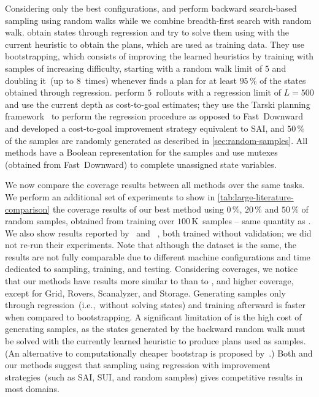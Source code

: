 Considering only the best configurations, \citet{ferber2022neural} and \citet{otoole2022sampling} perform backward search-based sampling using random walks while we combine breadth-first search with random walk. \citet{ferber2022neural} obtain states through regression and try to solve them using \gbfs with the current heuristic to obtain the plans, which are used as training data. They use bootstrapping, which consists of improving the learned heuristics by training with samples of increasing difficulty, starting with a random walk limit of $5$ and doubling it~(up to $8$~times) whenever \gbfs finds a plan for at least $95\,\%$ of the states obtained through regression. \citet{otoole2022sampling} perform $5$~rollouts with a regression limit of $L=500$ and use the current depth as cost-to-goal estimates; they use the Tarski planning framework~\cite{tarski2018github} to perform the regression procedure as opposed to Fast~Downward and developed a cost-to-goal improvement strategy equivalent to SAI, and $50\,\%$ of the samples are randomly generated as described in \cref{sec:random-samples}. All methods have a Boolean representation for the samples and use mutexes (obtained from Fast~Downward) to complete unassigned state variables.

We now compare the coverage results between all methods over the same tasks. We perform an additional set of experiments to show in \cref{tab:large-literature-comparison} the coverage results of our best method using $0\,\%$, $20\,\%$ and $50\,\%$ of random samples, obtained from training over $100$\,K~samples -- same quantity as \citet{otoole2022sampling}. We also show results reported by \citet{ferber2022neural}~\hboot and \citet{otoole2022sampling}~\hnrsl, both trained without validation; we did not re-run their experiments. Note that although the dataset is the same, the results are not fully comparable due to different machine configurations and time dedicated to sampling, training, and testing. Considering coverages, we notice that our methods have results more similar to \hnrsl than to \hboot, and higher coverage, except for Grid, Rovers, Scanalyzer, and Storage. Generating samples only through regression~(i.e.,~without solving states) and training afterward is faster when compared to bootstrapping. A significant limitation of \citet{ferber2020neural} is the high cost of generating samples, as the states generated by the backward random walk must be solved with the currently learned heuristic to produce plans used as samples. (An alternative to computationally cheaper bootstrap is proposed by~\citet{lelis2013cluster}.) Both \hnrsl and our methods suggest that sampling using regression with improvement strategies~(such as SAI, SUI, and random samples) gives competitive results in most domains.

